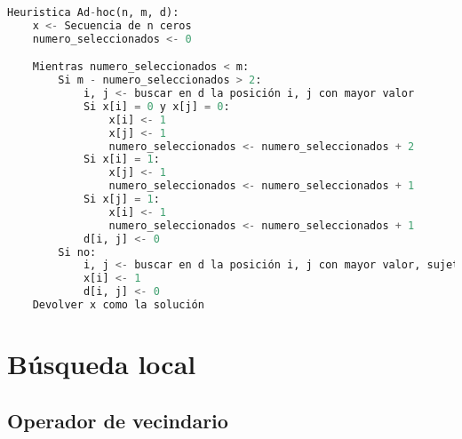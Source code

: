 \begin{lstlisting}[language=python]
Heuristica Ad-hoc(n, m, d):
	x <- Secuencia de n ceros
	numero_seleccionados <- 0

	Mientras numero_seleccionados < m:
		Si m - numero_seleccionados > 2:
			i, j <- buscar en d la posición i, j con mayor valor
			Si x[i] = 0 y x[j] = 0:
				x[i] <- 1
				x[j] <- 1
				numero_seleccionados <- numero_seleccionados + 2
			Si x[i] = 1:
				x[j] <- 1
				numero_seleccionados <- numero_seleccionados + 1
			Si x[j] = 1:
				x[i] <- 1
				numero_seleccionados <- numero_seleccionados + 1
			d[i, j] <- 0
		Si no:
			i, j <- buscar en d la posición i, j con mayor valor, sujeto a que x[j] = 1
			x[i] <- 1
			d[i, j] <- 0
	Devolver x como la solución
\end{lstlisting}

\section{Búsqueda local}

\subsection{Operador de vecindario}
